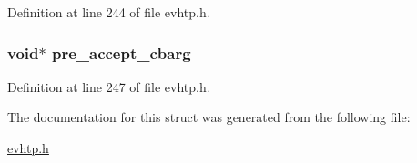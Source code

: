 \-Definition at line 244 of file evhtp.\-h.

\hypertarget{structevhtp__defaults__s_a0f92afb003b402ad524c0a95d13b4fb7}{
\subsubsection[{pre\-\_\-accept\-\_\-cbarg}]{\setlength{\rightskip}{0pt plus 5cm}void$\ast$ {\bf pre\-\_\-accept\-\_\-cbarg}}}\label{structevhtp__defaults__s_a0f92afb003b402ad524c0a95d13b4fb7}


\-Definition at line 247 of file evhtp.\-h.



\-The documentation for this struct was generated from the following file\-:\begin{DoxyCompactItemize}
\item 
\hyperlink{evhtp_8h}{evhtp.\-h}\end{DoxyCompactItemize}
